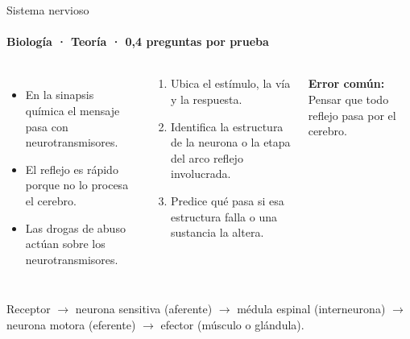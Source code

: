 \documentclass[aspectratio=169,11pt]{beamer}
\newlength{\ajustealto}
\newenvironment{ajustar}[1][0.74\textheight]
  {\setlength{\ajustealto}{#1}\begin{lrbox}{\ajustecaja}\begin{minipage}{\textwidth}}
  {\end{minipage}\end{lrbox}%
   \ifdim\dimexpr\ht\ajustecaja+\dp\ajustecaja\relax>\ajustealto
     \resizebox*{!}{\ajustealto}{\usebox{\ajustecaja}}\else\usebox{\ajustecaja}\fi}
\begin{document}
\begin{frame}{Sistema nervioso}
\label{tema-cs-nervioso}
\framesubtitle{Biología · Teoría · 0,4 preguntas por prueba}
\begin{ajustar}
\begin{columns}[T,onlytextwidth]
\begin{itemize}\footnotesize
\item En la sinapsis química el mensaje pasa con neurotransmisores.
\item El reflejo es rápido porque no lo procesa el cerebro.
\item Las drogas de abuso actúan sobre los neurotransmisores.
\end{itemize}
\begin{cajaregla}\scriptsize \begin{enumerate}\item Ubica el estímulo, la vía y la respuesta.\item Identifica la estructura de la neurona o la etapa del arco reflejo involucrada.\item Predice qué pasa si esa estructura falla o una sustancia la altera.\end{enumerate}\end{cajaregla}
\begin{notagris}\scriptsize \textbf{Error común:} Pensar que todo reflejo pasa por el cerebro.\end{notagris}
\end{columns}
\begin{cajaclave}\footnotesize
Receptor $\rightarrow$ neurona sensitiva (aferente) $\rightarrow$ médula espinal (interneurona) $\rightarrow$ neurona motora (eferente) $\rightarrow$ efector (músculo o glándula).
\end{cajaclave}
\end{ajustar}
\end{frame}
\end{document}
